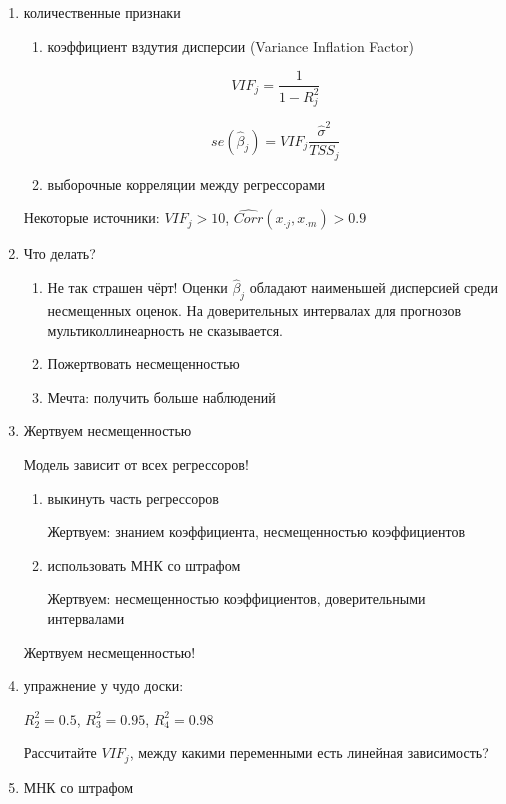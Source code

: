 \documentclass[12pt,a4paper]{article}
\begin{document}
{\begin{enumerate}
\item количественные признаки

\begin{enumerate}
\item коэффициент вздутия дисперсии (Variance Inflation Factor)

\[
VIF_j=\frac{1}{1-R^2_j}
\]

\[
se(\hat{\beta}_j)=VIF_j  \frac{\hat{\sigma}^2}{TSS_j}
\]

\item выборочные корреляции между регрессорами
\end{enumerate}

Некоторые источники: $VIF_j > 10$, $\widehat{Corr}(x_{\cdot j},x_{\cdot m})>0.9$

\item Что делать?

\begin{enumerate}
\item Не так страшен чёрт! Оценки $\hat{\beta}_j$ обладают наименьшей дисперсией среди несмещенных оценок. На доверительных интервалах для прогнозов мультиколлинеарность не сказывается.
\item Пожертвовать несмещенностью
\item Мечта: получить больше наблюдений 
\end{enumerate}

\item Жертвуем несмещенностью

Модель зависит от всех регрессоров!

\begin{enumerate}
\item выкинуть часть регрессоров

Жертвуем: знанием коэффициента, несмещенностью коэффициентов

\item использовать МНК со штрафом 

Жертвуем: несмещенностью коэффициентов, доверительными интервалами
\end{enumerate}

Жертвуем несмещенностью!

\item упражнение у чудо доски:

$R^2_2=0.5$, $R^2_3=0.95$, $R^2_4=0.98$

Рассчитайте $VIF_j$, между какими переменными есть линейная зависимость?

\item МНК со штрафом 


\end{enumerate}}
\end{document}
